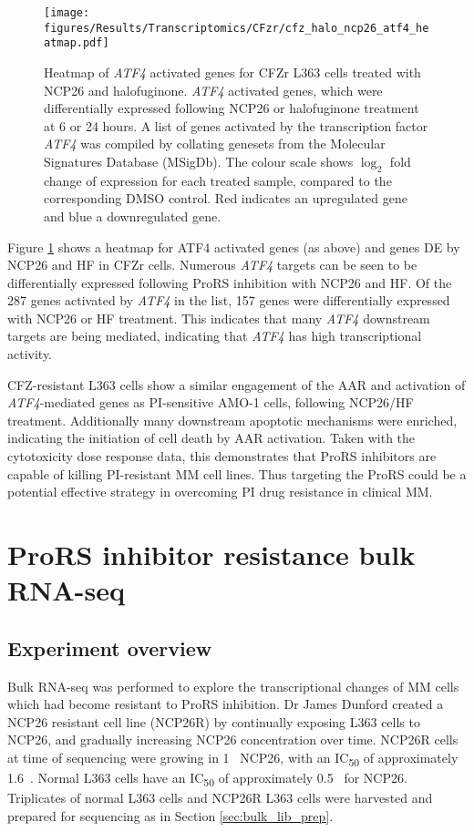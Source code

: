 \begin{figure}[p]
\centering
\texttt{[image: figures/Results/Transcriptomics/CFzr/cfz\_halo\_ncp26\_atf4\_heatmap.pdf]}
\caption[\textit{ATF4} activated genes heatmap- CFZr cells]{Heatmap of \textit{ATF4} activated genes for CFZr L363 cells treated with NCP26 and halofuginone.
\textit{ATF4} activated genes, which were differentially expressed following NCP26 or halofuginone treatment at 6 or 24 hours.
A list of genes activated by the transcription factor \textit{ATF4} was compiled by collating genesets from the Molecular Signatures Database (MSigDb).
The colour scale shows $\log_{2}$ fold change of expression for each treated sample, compared to the corresponding DMSO control.
Red indicates an upregulated gene and blue a downregulated gene.
}
\label{fig:cfz_atf4_heatmap}
\end{figure}

Figure \ref{fig:cfz_atf4_heatmap} shows a heatmap for ATF4 activated genes (as above) and genes DE by NCP26 and HF in CFZr cells.
Numerous \textit{ATF4} targets can be seen to be differentially expressed following ProRS inhibition with NCP26 and HF.
Of the 287 genes activated by \textit{ATF4} in the list, 157 genes were differentially expressed with NCP26 or HF treatment.
This indicates that many \textit{ATF4} downstream targets are being mediated, indicating that \textit{ATF4} has high transcriptional activity.

CFZ-resistant L363 cells show a similar engagement of the AAR and activation of \textit{ATF4}-mediated genes as PI-sensitive AMO-1 cells, following NCP26/HF treatment.
Additionally many downstream apoptotic mechanisms were enriched, indicating the initiation of cell death by AAR activation.
Taken with the cytotoxicity dose response data, this demonstrates that ProRS inhibitors are capable of killing PI-resistant MM cell lines.
Thus targeting the ProRS could be a potential effective strategy in overcoming PI drug resistance in clinical MM\@.

\section{ProRS inhibitor resistance bulk RNA-seq}

\subsection{Experiment overview}
Bulk RNA-seq was performed to explore the transcriptional changes of MM cells which had become resistant to ProRS inhibition.
Dr James Dunford created a NCP26 resistant cell line (NCP26R) by continually exposing L363 cells to NCP26, and gradually increasing NCP26 concentration over time.
NCP26R cells at time of sequencing were growing in 1\si{\micro\Molar} NCP26, with an IC\textsubscript{50} of approximately 1.6\si{\micro\Molar}.
Normal L363 cells have an IC\textsubscript{50} of approximately 0.5\si{\micro\Molar} for NCP26.
Triplicates of normal L363 cells and NCP26R L363 cells were harvested and prepared for sequencing as in Section \ref{sec:bulk_lib_prep}.

